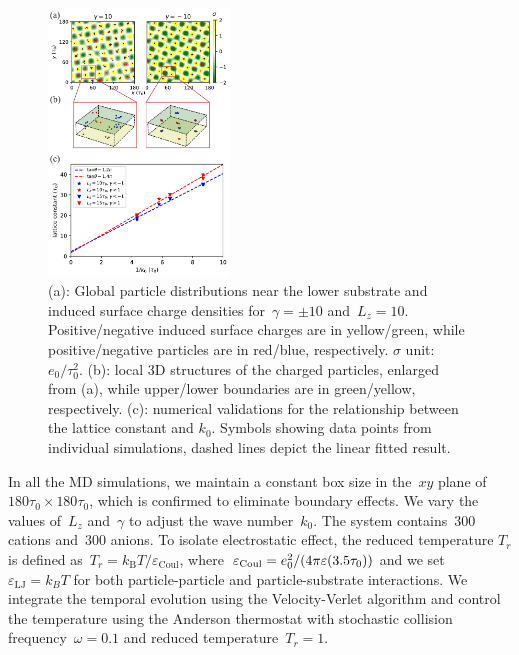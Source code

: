 \begin{figure}
	\centering
	\includegraphics[width=0.43\textwidth]{figs/fig4.pdf}
	\caption{\label{fig:MD} 
        (a): Global particle distributions near the lower substrate and induced surface charge densities for~$\gamma = \pm 10$ and~$L_z = 10$. 
        Positive/negative induced surface charges are in yellow/green, while positive/negative particles are in red/blue, respectively.
        $\sigma$ unit:~$e_0/\tau_0^2$.
        (b): local 3D structures of the charged particles, enlarged from (a), while upper/lower boundaries are in green/yellow, respectively.
        (c): numerical validations for the relationship between the lattice constant and $k_0$. Symbols showing data points from individual simulations, dashed lines depict the linear fitted result.}
\end{figure}

In all the MD simulations, we maintain a constant box size in the~$xy$ plane of~$180\tau_0 \times 180\tau_0$, which is confirmed to eliminate boundary effects.
We vary the values of~$L_z$ and~$\gamma$ to adjust the wave number~$k_0$. 
The system contains~$300$ cations and~$300$ anions.
To isolate electrostatic effect, the reduced temperature $T_r$ is defined as~$T_r =k_{\mathrm B}T/\varepsilon_{\mathrm{Coul}}$, where~$\varepsilon_{\mathrm{Coul}} = e_0^2/(4 \pi \varepsilon (3.5 \tau_0))$ and we set~$\varepsilon_{\mathrm{LJ}} = k_B T$ for both particle-particle and particle-substrate interactions. 
We integrate the temporal evolution using the Velocity-Verlet algorithm and control the temperature using the Anderson thermostat with stochastic collision frequency~$\omega = 0.1$ and reduced temperature~$T_r = 1$.

